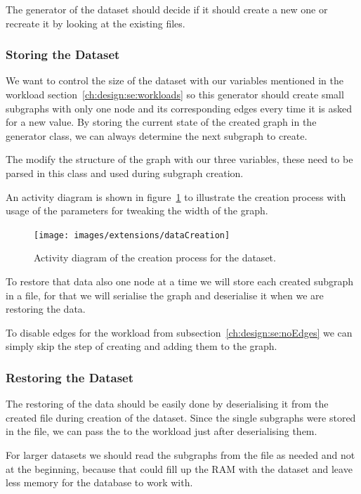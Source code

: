 The generator of the dataset should decide if it should create a new one or recreate it by looking at the existing files.

\subsubsection{Storing the Dataset}
\label{ch:design:se:storingTheDataset}
We want to control the size of the dataset with our variables mentioned in the workload section~\ref{ch:design:se:workloads} so this generator should create small subgraphs with only one node and its corresponding edges every time it is asked for a new value.
By storing the current state of the created graph in the generator class,
we can always determine the next subgraph to create.

The modify the structure of the graph with our three variables,
these need to be parsed in this class and used during subgraph creation.

An activity diagram is shown in figure~\ref{fig:dataCreation} to illustrate the creation process with usage of the parameters for tweaking the width of the graph.

\begin{figure}
  \texttt{[image: images/extensions/dataCreation]}
  \caption{Activity diagram of the creation process for the dataset.}
  \label{fig:dataCreation}
\end{figure}


To restore that data also one node at a time we will store each created subgraph in a file,
for that we will serialise the graph and deserialise it when we are restoring the data.

To disable edges for the workload from subsection~\ref{ch:design:se:noEdges} we can simply skip the step of creating and adding them to the graph.

\subsubsection{Restoring the Dataset}
\label{ch:design:se:restoringTheDataset}
The restoring of the data should be easily done by deserialising it from the created file during creation of the dataset.
Since the single subgraphs were stored in the file,
we can pass the to the workload just after deserialising them.

For larger datasets we should read the subgraphs from the file as needed and not at the beginning,
because that could fill up the RAM with the dataset and leave less memory for the database to work with.

